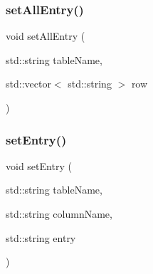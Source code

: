 \mbox{\label{entry_8cpp_aeb45ccd70b8692b592754a0886c2d109}} 
\subsubsection{set\+All\+Entry()}
{\footnotesize\ttfamily void set\+All\+Entry (\begin{DoxyParamCaption}\item[{std\+::string}]{table\+Name,  }\item[{std\+::vector$<$ std\+::string $>$}]{row }\end{DoxyParamCaption})}

\mbox{\label{entry_8cpp_a1faab165d9a7dc43808e1a0075e007f9}} 
\subsubsection{set\+Entry()}
{\footnotesize\ttfamily void set\+Entry (\begin{DoxyParamCaption}\item[{std\+::string}]{table\+Name,  }\item[{std\+::string}]{column\+Name,  }\item[{std\+::string}]{entry }\end{DoxyParamCaption})}

